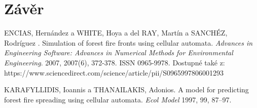 \documentclass[11pt,a4paper]{scrartcl}
\begin{document}
	\section{Závěr}
	
	\begin{thebibliography}{9}
		
		ENCIAS, Hernández a WHITE, Hoya a del RAY, Martín a SANCHÉZ, Rodríguez . Simulation of forest fire fronts using cellular automata. \textit{Advances in Engineering Software: Advances in Numerical Methods for Environmental Engineering}. 2007, 2007(6), 372-378. ISSN 0965-9978. Dostupné také z: https://www.sciencedirect.com/science/article/pii/S0965997806001293
		
		KARAFYLLIDIS, Ioannis a THANAILAKIS, Adonios. A model for predicting forest fire spreading using cellular automata. \textit{Ecol Model} 1997, 99, 87–97.
	\end{thebibliography}
	
\end{document}
